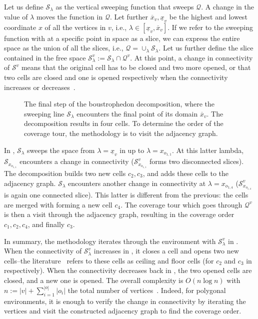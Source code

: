 Let us define $\mathcal{S}_\lambda$ as the vertical sweeping function that sweeps $\mathcal{Q}$. A change in the value of $\lambda$ moves the function in $\mathcal{Q}$. Let further $\overline{x}_v,\underline{x}_v$ be the highest and lowest coordinate $x$ of all the vertices in $v$, i.e., $\lambda\in[\underline{x}_v,\overline{x}_v]$. If we refer to the sweeping function with at a specific point in space as a slice, we can express the entire space as the union of all the slices, i.e., $\mathcal{Q}=\cup_{\lambda}\mathcal{S}_\lambda$. Let us further define the slice contained in the free space $\mathcal{S}^v_\lambda:=\mathcal{S}_\lambda\cap\mathcal{Q}^{v}$.
At this point, a change in connectivity of $\mathcal{S}^v$ means that the original cell has to be closed and two more opened, or that two cells are closed and one is opened respectively when the connectivity increases or decreases~\citep{choset2000exact}. 
\begin{figure}[h]
  \centering
  \selectfont
  
  \caption[Result of the boustrophedon decomposition]{The final step of the boustrophedon decomposition, where the sweeping line $\mathcal{S}_{\lambda}$ encounters the final point of its domain $\overline{x}_v$. The decomposition results in four cells. To determine the order of the coverage tour, the methodology is to  visit the adjacency graph.}
  \label{fig:bcd4}
\end{figure}
In , $\mathcal{S}_\lambda$ sweeps the space from $\lambda=\underline{x}_v$ in  up to $\lambda=x_{o_{1,1}}$. At this latter lambda, $\mathcal{S}_{x_{o_{1,1}}}$ encounters a change in connectivity ($\mathcal{S}^v_{x_{o_{1,1}}}$ forms two disconnected slices). The decomposition builds two new cells $c_2,c_3$, and adds these cells to the adjacency graph. $\mathcal{S}_\lambda$ encounters another change in connectivity at $\lambda=x_{o_{1,4}}$ ($\mathcal{S}^v_{x_{o_{1,4}}}$ is again one connected slice). This latter is different from the previous: the cells are merged with forming a new cell $c_4$. The coverage tour which goes through $\mathcal{Q}^v$ is then a visit through the adjacency graph, resulting in the coverage order $c_1,c_2,c_4$, and finally $c_3$.  

In summary, the methodology iterates through the environment with $\mathcal{S}^v_{\lambda}$ in . When the connectivity of $\mathcal{S}^v_{\lambda}$ increases in , it closes a cell and opens two new cells--the literature~\citep{choset2000exact,choset2005principles} refers to these cells as ceiling and floor cells (for $c_2$ and $c_3$ in~ respectively). When the connectivity decreases back in , the two opened cells are closed, and a new one is opened. The overall complexity is $O(n\log{n})$ with $n:=|v|+\sum_{i=1}^{|o|}|o_i|$ the total number of vertices~\citep{choset2000exact}. Indeed, for polygonal environments, it is enough to verify the change in connectivity by iterating the vertices and visit the constructed adjacency graph to find the coverage order. 

